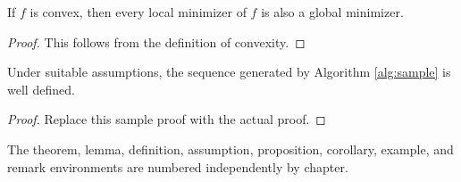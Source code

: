 \begin{lemma}\label{lem:sample}
If $f$ is convex, then every local minimizer of $f$ is also a global minimizer.
\end{lemma}

\begin{proof}
This follows from the definition of convexity.
\end{proof}

\begin{theorem}\label{thm:sample}
Under suitable assumptions, the sequence generated by Algorithm \ref{alg:sample} is well defined.
\end{theorem}

\begin{proof}
Replace this sample proof with the actual proof.
\end{proof}

\begin{remark}
The theorem, lemma, definition, assumption, proposition, corollary, example, and remark environments are numbered independently by chapter.
\end{remark}
